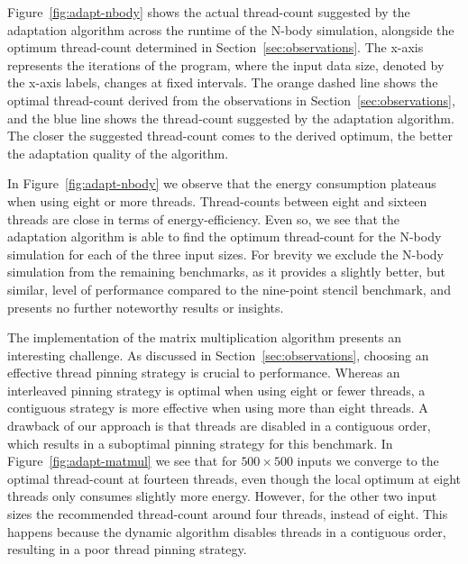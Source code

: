 Figure~\ref{fig:adapt-nbody} shows the actual thread-count suggested by the adaptation algorithm
across the runtime of the N-body simulation, alongside the optimum thread-count determined in
Section~\ref{sec:observations}. The x-axis represents the iterations of the program, where the input
data size, denoted by the x-axis labels, changes at fixed intervals. The orange dashed line shows
the optimal thread-count derived from the observations in Section~\ref{sec:observations}, and the
blue line shows the thread-count suggested by the adaptation algorithm. The closer the suggested
thread-count comes to the derived optimum, the better the adaptation quality of the algorithm.

In Figure~\ref{fig:adapt-nbody} we observe that the energy consumption plateaus when using eight or
more threads. Thread-counts between eight and sixteen threads are close in terms of
energy-efficiency. Even so, we see that the adaptation algorithm is able to find the optimum
thread-count for the N-body simulation for each of the three input sizes. For brevity we exclude the
N-body simulation from the remaining benchmarks, as it provides a slightly better, but similar,
level of performance compared to the nine-point stencil benchmark, and presents no further
noteworthy results or insights.

The \sac{} implementation of the matrix multiplication algorithm presents an interesting challenge.
As discussed in Section~\ref{sec:observations}, choosing an effective thread pinning strategy is
crucial to performance. Whereas an interleaved pinning strategy is optimal when using eight or fewer
threads, a contiguous strategy is more effective when using more than eight threads. A drawback of
our approach is that threads are disabled in a contiguous order, which results in a suboptimal
pinning strategy for this benchmark. In Figure~\ref{fig:adapt-matmul} we see that for $500 \times
500$ inputs we converge to the optimal thread-count at fourteen threads, even though the local
optimum at eight threads only consumes slightly more energy. However, for the other two input sizes
the recommended thread-count around four threads, instead of eight. This happens because the dynamic
algorithm disables threads in a contiguous order, resulting in a poor thread pinning strategy.

